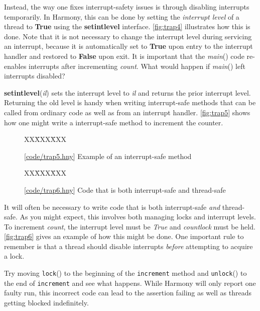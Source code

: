 \documentclass{report}
\newcommand{\harmonysource}[1]{
\begin{tabbing}
XX\=XXX\=XXX\kill
    
\end{tabbing}
}
\newcommand{\harmonylink}[1]{%
[\href{https://harmony.cs.cornell.edu/#1}{\underline{#1}}]%
}
\newenvironment{code}{
\tcolorbox
}{
\endtcolorbox
}
\begin{document}
Instead, the way one fixes interrupt-safety issues is through disabling interrupts
temporarily.  In Harmony, this can be done by setting the \textit{interrupt level}
of a thread to \textbf{True} using the \textbf{setintlevel} interface.
\autoref{fig:trap4} illustrates how this is done.
Note that it is not necessary to change the interrupt level during servicing an
interrupt, because it is automatically set to \textbf{True} upon entry to the interrupt
handler and restored to \textbf{False} upon exit.
It is important that the \textit{main}() code re-enables interrupts after incrementing
\textit{count}.  What would happen if \textit{main}() left interrupts disabled?

\textbf{setintlevel}(\textit{il}) sets the interrupt level to \textit{il} and returns
the prior interrupt level.  Returning the old level is handy when writing interrupt-safe
methods that can be called from ordinary code as well as from an interrupt handler.
\autoref{fig:trap5} shows how one might write a interrupt-safe method
to increment the counter.

\begin{figure}
\begin{code}
\harmonysource{trap5}
\end{code}
\caption{\harmonylink{code/trap5.hny} Example of an interrupt-safe method}
\label{fig:trap5}
\end{figure}

\begin{figure}
\begin{code}
\harmonysource{trap6}
\end{code}
\caption{\harmonylink{code/trap6.hny} Code that is both interrupt-safe and thread-safe}
\label{fig:trap6}
\end{figure}

It will often be necessary to write code that is both interrupt-safe \emph{and}
thread-safe.  As you might expect, this involves both managing locks and
interrupt levels.
To increment \textit{count}, the interrupt level must be \textit{True} and
\textit{countlock} must be held.
\autoref{fig:trap6} gives an example of how this might be done.
One important rule to remember is that a thread should disable interrupts \emph{before}
attempting to acquire a lock.

Try moving \texttt{lock}() to the beginning of the \texttt{increment} method
and \texttt{unlock}() to the end of \texttt{increment} and see what happens.
While Harmony will only report one faulty run, this incorrect code can lead to
the assertion failing as well as threads getting blocked indefinitely.
\end{document}

